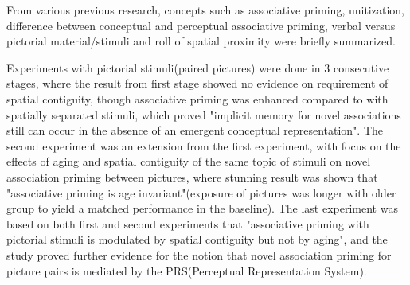 From various previous research, concepts such as associative priming, unitization, difference between conceptual and perceptual associative priming, verbal versus pictorial material/stimuli and roll of spatial proximity were briefly summarized.


Experiments with pictorial stimuli(paired pictures) were done in 3 consecutive stages, where the result from first stage showed no evidence on requirement of spatial contiguity, though associative priming was enhanced compared to with spatially separated stimuli, which proved "implicit memory for novel associations still can occur in the absence of an emergent conceptual representation". The second experiment was an extension from the first experiment, with focus on the effects of aging and spatial contiguity of the same topic of stimuli on novel association priming between pictures, where stunning result was shown that "associative priming is age invariant"(exposure of pictures was longer with older group to yield a matched performance in the baseline). The last experiment was based on both first and second experiments that "associative priming with pictorial stimuli is modulated by spatial contiguity but not by aging", and the study proved further evidence for the notion that novel association priming for picture pairs is mediated by the PRS(Perceptual Representation System).
